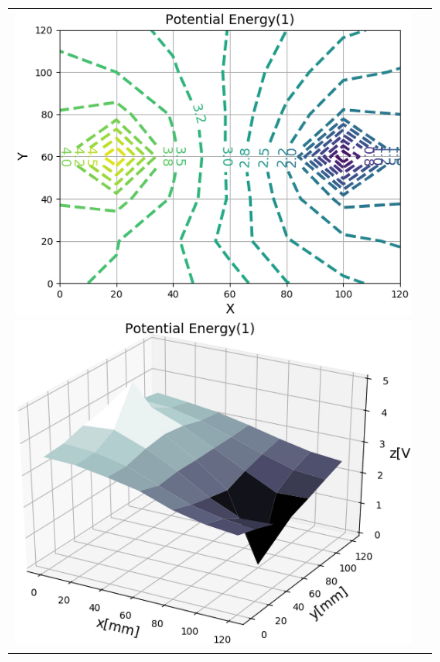 \documentclass[uplatex,a4paper,11pt,oneside,openany]{jsbook}
\begin{document}
\begin{figure}[H]
  \centering
  \begin{tabular}{ll}
      \begin{minipage}{0.5\hsize}
        \centering
        \includegraphics[scale=0.5]{./figure/contr1.eps}
      \end{minipage}
      \begin{minipage}{0.5\hsize}
        \centering
        \includegraphics[scale=0.5]{./figure/contr2.eps}
      \end{minipage}
    \end{tabular}
\end{figure}
\end{document}
